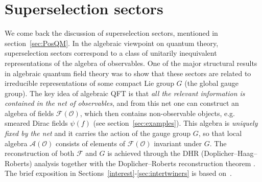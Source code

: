 \documentclass[12pt,a4paper]{article}
\newcommand{\1}{\mathds{1}}                         %
\newcommand{\F}{\mathcal{F}}
\newcommand{\Ocal}{\mathcal{O}}
\newcommand{\Ac}{{\mathcal{A}}}
\newcommand{\Fc}{{\mathcal{F}}}
\begin{document}
 
 




\section{Superselection sectors}\label{sec:sectors}
We come back the discussion of superselection sectors, mentioned in section~\ref{sec:PosQM}. In the algebraic viewpoint on quantum theory, superselection sectors correspond to a class of unitarily inequivalent representations of the algebra of observables. One of the major structural results in algebraic quantum field theory \cite{DHR1,DHR2,DHR3,DHR4,DR89} was to show that these sectors are related to irreducible representations of some compact Lie group $G$ (the global gauge group). The key idea of algebraic QFT is that \textit{all the relevant information is contained in the net of observables}, and from this net one can construct an algebra of fields $\F(\Ocal)$, which then contains non-observable objects, e.g. smeared Dirac fields $\psi(f)$ (see section~\ref{sec:examples}). This algebra is \textit{uniquely fixed by the net} and it carries the action of the gauge group $G$, so that local algebra $\Ac(\Ocal)$ consists of elements of $\Fc(\Ocal)$ invariant under $G$. The reconstruction of both $\Fc$ and $G$ is achieved through the DHR (Doplicher--Haag--Roberts) analysis \cite{DHR1,DHR2,DHR3,DHR4} together with the Doplicher--Roberts reconstruction theorem \cite{DR89}. The brief exposition in Sections~\ref{interest}-\ref{sec:intertwiners} is based on~\cite{KlausSuperselection}.
\end{document}
